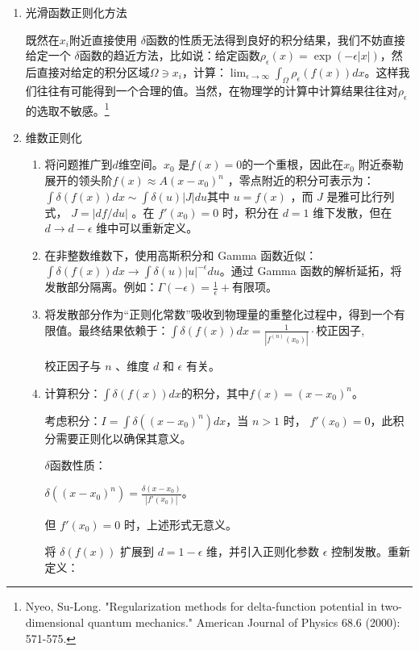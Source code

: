 \documentclass[lang=cn,10pt,newtx,bibend=biber,device=pad]{elegantbook}
\begin{document}
\begin{enumerate}
    \item 光滑函数正则化方法

    既然在$x_i$附近直接使用 $\delta$函数的性质无法得到良好的积分结果，我们不妨直接给定一个 $\delta$函数的趋近方法，比如说：给定函数$\rho_\epsilon(x) = \exp(-\epsilon|x|)$，然后直接对给定的积分区域$\Omega \owns x_i$，计算：$\lim_{\epsilon\rightarrow \infty} \int_{\Omega} \rho_\epsilon(f(x)) dx$。这样我们往往有可能得到一个合理的值。当然，在物理学的计算中计算结果往往对$\rho_\epsilon$ 的选取不敏感。\footnote{Nyeo, Su-Long. "Regularization methods for delta-function potential in two-dimensional quantum mechanics." American Journal of Physics 68.6 (2000): 571-575.}
    \item 维数正则化

    \begin{enumerate}
        \item 将问题推广到$d$维空间。$x_0$ 是$f(x) = 0$的一个重根，因此在$x_0$ 附近泰勒展开的领头阶$f(x) \approx  A(x-x_0)^n$ ，零点附近的积分可表示为：$\int \delta(f(x)) dx \sim \int \delta(u) |J| du$其中  $u = f(x)$ ，而  $J$  是雅可比行列式， $J = |df/du|$ 。在  $f{\prime}(x_0) = 0$  时，积分在  $d=1$  维下发散，但在  $d \to d-\epsilon$  维中可以重新定义。
        \item 在非整数维数下，使用高斯积分和 Gamma 函数近似：$\int \delta(f(x)) dx \to \int \delta(u) |u|^{-\epsilon} du$。通过 Gamma 函数的解析延拓，将发散部分隔离。例如：$\Gamma(-\epsilon) = \frac{1}{\epsilon} + \text{有限项}$。
        \item 将发散部分作为“正则化常数”吸收到物理量的重整化过程中，得到一个有限值。最终结果依赖于：$\int \delta(f(x)) dx = \frac{1}{|f^{(n)}(x_0)|} \cdot \text{校正因子}$,

        校正因子与  $n$ 、维度  $d$  和  $\epsilon$  有关。
        \item 
        \begin{example}
        计算积分：$\int \delta(f(x))dx$的积分，其中$f(x) = (x-x_0)^n$。

        考虑积分：$ I = \int \delta((x - x_0)^n) dx $，当  $n > 1$  时， $f{\prime}(x_0) = 0$，此积分需要正则化以确保其意义。

        $\delta$函数性质：

        $\delta((x - x_0)^n) = \frac{\delta(x - x_0)}{|f{\prime}(x_0)|}$。

        但  $f{\prime}(x_0) = 0$  时，上述形式无意义。

        将  $\delta(f(x))$  扩展到  $d = 1 - \epsilon$  维，并引入正则化参数  $\epsilon$  控制发散。重新定义：


\end{example}
\end{enumerate}
\end{enumerate}
\end{document}
